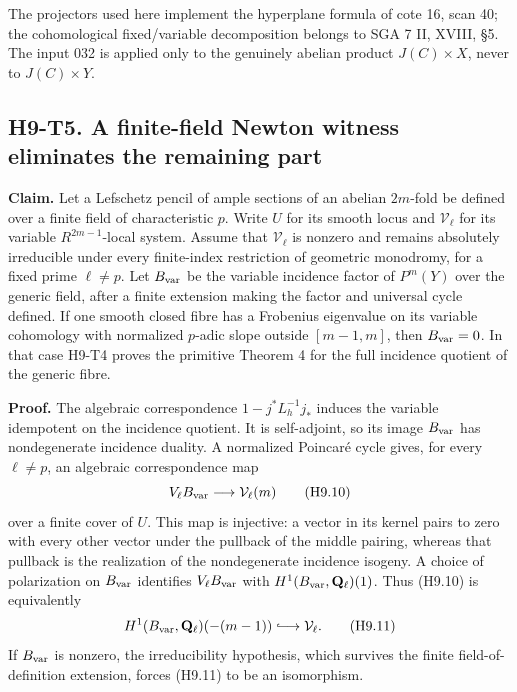 The projectors used here implement the hyperplane formula of cote 16,
scan 40; the cohomological fixed/variable decomposition belongs to
SGA 7 II, XVIII, \S5. The input 032 is applied only to the genuinely
abelian product $J(C)\times X$, never to $J(C)\times Y$.

\subsection*{H9-T5. A finite-field Newton witness eliminates the remaining part}

\textbf{Claim.} Let a Lefschetz pencil of ample sections of an abelian
$2m$-fold be defined over a finite field of characteristic $p$. Write
$U$ for its smooth locus and $\mathcal V_\ell$ for its variable
$R^{2m-1}$-local system. Assume that $\mathcal V_\ell$ is nonzero and
remains absolutely irreducible under every finite-index restriction of
geometric monodromy, for a fixed prime $\ell\ne p$. Let
$B_{\rm var}$ be the variable incidence factor of $P^m(Y)$ over the
generic field, after a finite extension making the factor and universal
cycle defined. If one smooth closed fibre has a Frobenius eigenvalue on
its variable cohomology with normalized $p$-adic slope outside
$[m-1,m]$, then $B_{\rm var}=0$. In that case H9-T4 proves the primitive
Theorem 4 for the full incidence quotient of the generic fibre.

\textbf{Proof.}
The algebraic correspondence $1-j^*L_h^{-1}j_*$ induces the variable
idempotent on the incidence quotient. It is self-adjoint, so its image
$B_{\rm var}$ has nondegenerate incidence duality. A normalized Poincar\'e
cycle gives, for every $\ell\ne p$, an algebraic correspondence map
\[
 V_\ell B_{\rm var}\longrightarrow\mathcal V_\ell(m)
                                                        \tag{H9.10}
\]
over a finite cover of $U$. This map is injective: a vector in its
kernel pairs to zero with every other vector under the pullback of the
middle pairing, whereas that pullback is the realization of the
nondegenerate incidence isogeny. A choice of polarization on
$B_{\rm var}$ identifies $V_\ell B_{\rm var}$ with
$H^1(B_{\rm var},\mathbf Q_\ell)(1)$. Thus (H9.10) is equivalently
\[
 H^1(B_{\rm var},\mathbf Q_\ell)(-(m-1))
       \lhook\joinrel\longrightarrow\mathcal V_\ell.       \tag{H9.11}
\]
If $B_{\rm var}$ is nonzero, the irreducibility hypothesis, which survives
the finite field-of-definition extension, forces (H9.11) to be an
isomorphism.

